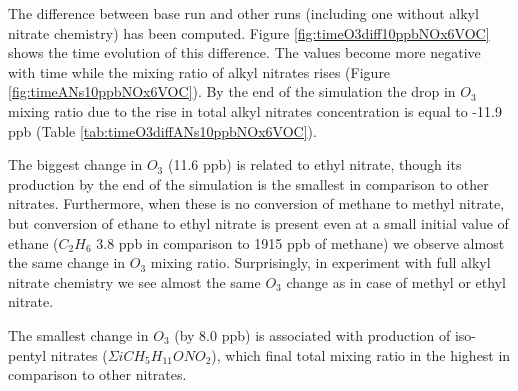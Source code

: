\documentclass[11pt,a4paper]{article}
\begin{document}
The difference between base run and other runs (including one without alkyl nitrate chemistry) has been computed. Figure \ref{fig:timeO3diff10ppbNOx6VOC} shows the time evolution of this difference. The values become more negative with time while the mixing ratio of alkyl nitrates rises (Figure \ref{fig:timeANs10ppbNOx6VOC}). By the end of the simulation the drop in $O_3$ mixing ratio due to the rise in total alkyl nitrates concentration is equal to -11.9 ppb (Table \ref{tab:timeO3diffANs10ppbNOx6VOC}). %

The biggest change in $O_3$ (11.6 ppb) is related to ethyl nitrate, though its production by the end of the simulation is the smallest in comparison to other nitrates. Furthermore, when these is no conversion of methane to methyl nitrate, but conversion of ethane to ethyl nitrate is present even at a small initial value of ethane ($C_2H_6$ 3.8 ppb in comparison to 1915 ppb of methane) we observe almost the same change in $O_3$ mixing ratio. Surprisingly, in experiment with full alkyl nitrate chemistry we see almost the same $O_3$ change as in case of methyl or ethyl nitrate.

The smallest change in $O_3$ (by 8.0 ppb) is associated with production of iso-pentyl nitrates ($\Sigma iCH_5H_{11}ONO_2$), which final total mixing ratio in the highest in comparison to other nitrates.
\end{document}
